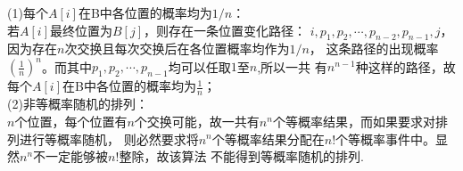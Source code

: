 \begin{solution}
    (1)每个$A[i]$在B中各位置的概率均为$1/n$：\\
    若$A[i]$最终位置为$B[j]$，则存在一条位置变化路径：
    $i,p_1,p_2,\cdots,p_{n-2},p_{n-1},j$，因为存在$n$次交换且每次交换后在各位置概率均作为$1/n$，
    这条路径的出现概率$(\frac{1}{n})^n$。而其中$p_1,p_2,\cdots,p_{n-1}$均可以任取$1$至$n$,所以一共
    有$n^{n-1}$种这样的路径，故每个$A[i]$在B中各位置的概率均为$\frac{1}{n}$；\\
    (2)非等概率随机的排列：\\
    $n$个位置，每个位置有$n$个交换可能，故一共有$n^n$个等概率结果，而如果要求对排列进行等概率随机，
    则必然要求将$n^n$个等概率结果分配在$n!$个等概率事件中。显然$n^n$不一定能够被$n!$整除，故该算法
    不能得到等概率随机的排列.

    



\end{solution}